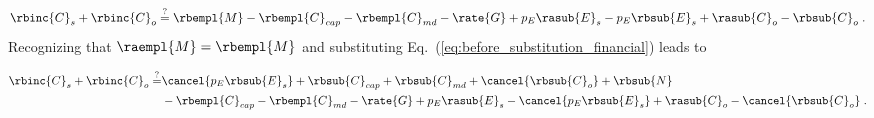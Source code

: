 \begin{equation}
  \rbinc{C}_s + \rbinc{C}_o \stackrel{?}{=} \rbempl{M} - \rbempl{C}_{cap} - \rbempl{C}_{md} - \rate{G} 
            + p_E \rasub{E}_s - p_E \rbsub{E}_s + \rasub{C}_o - \rbsub{C}_o \; .
\end{equation}
%
Recognizing that $\raempl{M} = \rbempl{M}$ and substituting Eq.~(\ref{eq:before_substitution_financial})
leads to 

\begin{align}
  \rbinc{C}_s + \rbinc{C}_o \stackrel{?}{=}  & \cancel{p_E \rbsub{E}_s} + \rbsub{C}_{cap} + \rbsub{C}_{md} 
                                              + \cancel{\rbsub{C}_o} + \rbsub{N} \\
                                            & - \rbempl{C}_{cap} - \rbempl{C}_{md} - \rate{G} 
                                              + p_E \rasub{E}_s - \cancel{p_E \rbsub{E}_s} 
                                              + \rasub{C}_o - \cancel{\rbsub{C}_o} \; .
\end{align}
%
